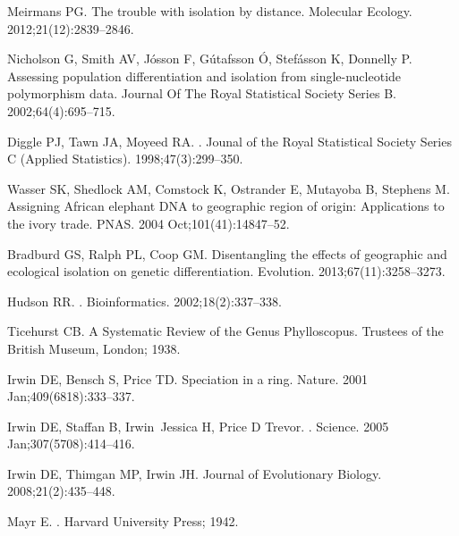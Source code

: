 \documentclass[10pt,letterpaper]{article}
\begin{document}
\begin{thebibliography}{80}
Meirmans PG.
\newblock The trouble with isolation by distance.
\newblock Molecular Ecology. 2012;21(12):2839--2846.

Nicholson G, Smith AV, J{\'o}sson F, G{\'u}tafsson {\'O}, Stef{\'a}sson K, Donnelly P.
\newblock Assessing population differentiation and isolation from
  single-nucleotide polymorphism data.
\newblock Journal Of The Royal Statistical Society Series B.
  2002;64(4):695--715.

Diggle PJ, Tawn JA, Moyeed RA.
.
\newblock Jounal of the Royal Statistical Society Series C (Applied
  Statistics). 1998;47(3):299--350.

Wasser SK, Shedlock AM, Comstock K, Ostrander E, Mutayoba B, Stephens M.
\newblock Assigning {African} elephant {DNA} to geographic region of origin:
  {Applications} to the ivory trade.
\newblock PNAS. 2004 Oct;101(41):14847--52.

Bradburd GS, Ralph PL, Coop GM.
\newblock Disentangling the effects of geographic and ecological isolation on genetic differentiation.
\newblock Evolution. 2013;67(11):3258--3273.

Hudson RR.
.
\newblock Bioinformatics. 2002;18(2):337--338.

Ticehurst CB.
\newblock A Systematic Review of the Genus Phylloscopus.
\newblock Trustees of the British Museum, London; 1938.

Irwin DE, Bensch S, Price TD.
\newblock Speciation in a ring.
\newblock Nature. 2001 Jan;409(6818):333--337.

Irwin DE, Staffan B, Irwin~Jessica H, Price D Trevor.
.
\newblock Science. 2005 Jan;307(5708):414--416.

Irwin DE, Thimgan MP, Irwin JH.
\newblock Journal of Evolutionary Biology. 2008;21(2):435--448.

Mayr E.
.
\newblock Harvard University Press; 1942.


\end{thebibliography}
\end{document}
